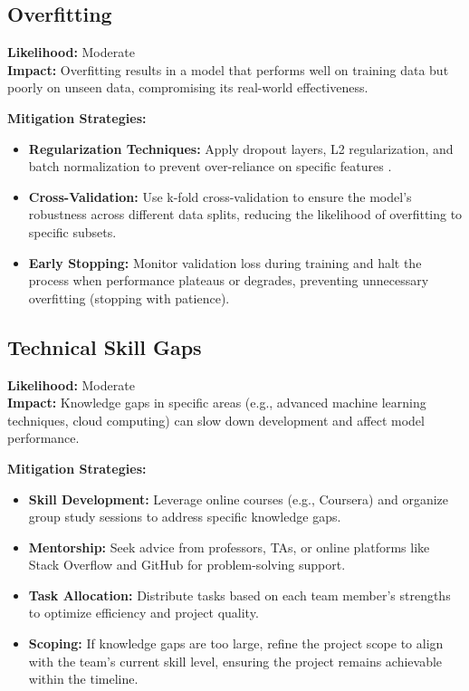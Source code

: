 \documentclass{article} %
\begin{document}
\subsection{Overfitting}
\textbf{Likelihood:} Moderate \\
\textbf{Impact:} Overfitting results in a model that performs well on training data but poorly on unseen data, compromising its real-world effectiveness.

\textbf{Mitigation Strategies:}
\begin{itemize}
    \item \textbf{Regularization Techniques:} Apply dropout layers, L2 regularization, and batch normalization to prevent over-reliance on specific features \citep{srivastava2014}.
    \item \textbf{Cross-Validation:} Use k-fold cross-validation to ensure the model's robustness across different data splits, reducing the likelihood of overfitting to specific subsets.
    \item \textbf{Early Stopping:} Monitor validation loss during training and halt the process when performance plateaus or degrades, preventing unnecessary overfitting (stopping with patience).
\end{itemize}

\subsection{Technical Skill Gaps}
\textbf{Likelihood:} Moderate \\
\textbf{Impact:} Knowledge gaps in specific areas (e.g., advanced machine learning techniques, cloud computing) can slow down development and affect model performance.

\textbf{Mitigation Strategies:}
\begin{itemize}
    \item \textbf{Skill Development:} Leverage online courses (e.g., Coursera) and organize group study sessions to address specific knowledge gaps.
    \item \textbf{Mentorship:} Seek advice from professors, TAs, or online platforms like Stack Overflow and GitHub for problem-solving support.
    \item \textbf{Task Allocation:} Distribute tasks based on each team member's strengths to optimize efficiency and project quality.
    \item \textbf{Scoping:} If knowledge gaps are too large, refine the project scope to align with the team's current skill level, ensuring the project remains achievable within the timeline.
\end{itemize}
\end{document}
